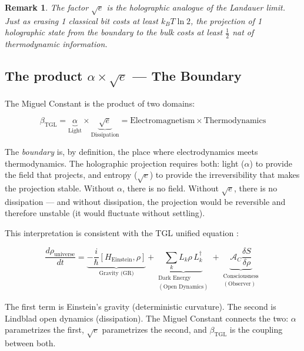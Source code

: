 \documentclass[12pt,a4paper,twoside]{article}
\newtheorem{remark}[theorem]{Remark}
\newcommand{\betatgl}{\beta_{\!\scriptscriptstyle\mathrm{TGL}}}
\newcommand{\boundary}{\textit{boundary}}
\newcommand{\bulk}{\textit{bulk}}
\begin{document}
\begin{remark}
The factor $\sqrt{e}$ is the holographic analogue of the Landauer limit. Just as erasing 1 classical bit costs at least $k_B T \ln 2$, the projection of 1 holographic state from the \boundary{} to the \bulk{} costs at least $\frac{1}{2}$ nat of thermodynamic information.
\end{remark}


\subsection{The product $\alpha \times \sqrt{e}$ --- The Boundary}

The Miguel Constant is the product of two domains:

\begin{factorbox}[title={Synthesis}]
\begin{equation}
\betatgl = \underbrace{\alpha}_{\text{Light}} \times \underbrace{\sqrt{e}}_{\text{Dissipation}} = \text{Electromagnetism} \times \text{Thermodynamics}
\label{eq:sintese}
\end{equation}
\end{factorbox}

\noindent The \boundary{} is, by definition, the place where electrodynamics meets thermodynamics. The holographic projection requires both: light ($\alpha$) to provide the field that projects, and entropy ($\sqrt{e}$) to provide the irreversibility that makes the projection stable. Without $\alpha$, there is no field. Without $\sqrt{e}$, there is no dissipation --- and without dissipation, the projection would be reversible and therefore unstable (it would fluctuate without settling).

This interpretation is consistent with the TGL unified equation \cite{Miguel2026Fronteira}:

\begin{equation}
\frac{d\rho_{\text{universe}}}{dt} = \underbrace{-\frac{i}{\hbar}[H_{\text{Einstein}}, \rho]}_{\text{Gravity (GR)}} + \underbrace{\sum_k L_k\rho\, L_k^\dagger}_{\substack{\text{Dark Energy}\\(\text{Open Dynamics})}} + \underbrace{\mathcal{A}_C\frac{\delta S}{\delta\rho}}_{\substack{\text{Consciousness}\\(\text{Observer})}}
\end{equation}

The first term is Einstein's gravity (deterministic curvature). The second is Lindblad open dynamics (dissipation). The Miguel Constant connects the two: $\alpha$ parametrizes the first, $\sqrt{e}$ parametrizes the second, and $\betatgl$ is the coupling between both.
\end{document}
